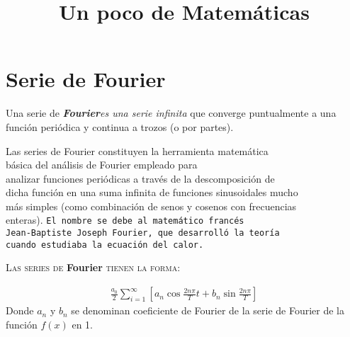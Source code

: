 \documentclass{report}
\title{Un poco de Matem\'aticas}
\date{}
\begin{document}
  
\maketitle 

\section{Serie de Fourier}

{\Huge U}{\large na serie de \textbf{\emph{Fourier}}\textit{es una serie infinita} que converge puntualmente a una funci\'on peri\'odica y continua a trozos (o por partes).}

\bigskip
\bigskip

\begin{flushright}
{\tiny Las} {\scriptsize series}{ \footnotesize de} {\small Fourier} {\normalsize constituyen} {\large la} {\Large herramienta} {\LARGE matem\'atica}\\
{\huge b\'asica} {\Huge del} {\huge an\'alisis} {\LARGE de} {\Large Fourier} {\large empleado para}\\
\large analizar funciones peri\'odicas a trav\'es de la descomposici\'on de\\
dicha funci\'on en  una suma infinita de funciones sinusoidales mucho\\
m\'as simples (como combinaci\'on de senos y cosenos con frecuencias\\
enteras). \texttt{El nombre se debe al matem\'atico franc\'es}\\
\texttt{Jean-Baptiste Joseph Fourier, que desarroll\'o la teor\'ia}\\
\texttt{cuando estudiaba la ecuaci\'on del calor.}
\end{flushright}

\smallskip

\textsc{\large Las series de} \textbf{\LARGE Fourier} \textsc{\large tienen la forma:}

\smallskip

\begin{eqnarray}
\frac{a_0}{2}\sum_{i=1}^{\infty}[a_n \cos\frac{2n\pi}{T}t + b_n \sin\frac{2n\pi}{T}]
\end{eqnarray}
{\large Donde $a_n$ y $b_n$ se denominan coeficiente de Fourier de la serie de Fourier de la funci\'on $f(x)$ en 1.}
\end{document}
